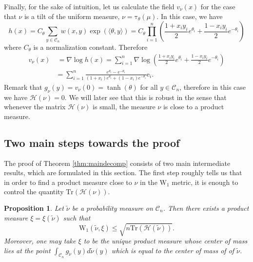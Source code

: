 \documentclass[12pt]{article}
\def \tilt{ \mathrm{\tau} }
\def \W{\mathrm{W_1}}
\def \tr {\mathrm{Tr}}
\def \DC {\mathcal{C}_n}
\def \HH {\mathcal{H}}
\newtheorem{proposition}[theorem]{Proposition}
\theoremstyle{definition}
\theoremstyle{remark}
\begin{document}
Finally, for the sake of intuition, let us calculate the field $v_\nu(x)$ for the case that $\nu$ is a tilt of the uniform measure, $\nu = \tilt_\theta(\mu)$. In this case, we have 
$$
h(x) = C_\theta \sum_{y \in \DC} w(x,y) \exp(\langle \theta, y \rangle) = C_\theta \prod_{i=1}^n \left ( \frac{1+x_i y_i}{2} e^{\theta_i} + \frac{1 - x_i y_i}{2} e^{-\theta_i} \right )
$$
where $C_\theta$ is a normalization constant. Therefore
\begin{align*}
v_\nu(x) &~ = \nabla \log h(x) = \sum_{i=1}^n \nabla \log \left ( \frac{1+x_i y_i}{2} e^{\theta_i} + \frac{1 - x_i y_i}{2} e^{-\theta_i} \right ) \\
& = \sum_{i=1}^n \frac{e^{\theta_i} - e^{-\theta_i}}{(1+x_i) e^{\theta_i} + (1-x_i) e^{-\theta_i}} \mathrm{e}_i.
\end{align*}
Remark that $g_\nu(y) = v_\nu(0) = \tanh(\theta)$ for all $y \in \DC$, therefore in this case we have $\HH(\nu) = 0$. We will later see that this is robust in the sense that whenever the matrix $\HH(\nu)$ is small, the measure $\nu$ is close to a product measure.

\subsection{Two main steps towards the proof} \label{sec:twoprops}

The proof of Theorem \ref{thm:maindecomp} consists of two main intermediate results, which are formulated in this section. The first step roughly tells us that in order to find a product measure close to $\nu$ in the $\W$ metric, it is enough to control the quantity $\tr \left (\HH(\nu) \right )$.
\begin{proposition} \label{prop:step1}
Let $\tilde \nu$ be a probability measure on $\DC$. Then there exists a product measure $\xi=\xi(\tilde \nu)$ such that
$$
\W(\tilde \nu, \xi) \leq \sqrt{n \tr \left ( \HH( \tilde \nu) \right )}.
$$
Moreover, one may take $\xi$ to be the unique product measure whose center of mass lies at the point $\int_{\DC} g_{\tilde \nu}(y) d \tilde \nu(y)$ which is equal to the center of mass of of $\tilde \nu$.
\end{proposition}
\end{document}
